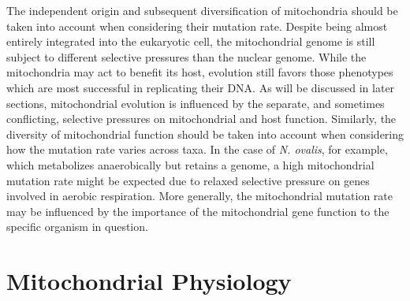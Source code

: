 \documentclass[12pt,twoside]{reedthesis}
\begin{document}
The independent origin and subsequent diversification of mitochondria should be taken into account when considering their mutation rate.
Despite being almost entirely integrated into the eukaryotic cell, the mitochondrial genome is still subject to different selective pressures than the nuclear genome.
While the mitochondria may act to benefit its host, evolution still favors those phenotypes which are most successful in replicating their DNA.
As will be discussed in later sections, mitochondrial evolution is influenced by the separate, and sometimes conflicting, selective pressures on mitochondrial and host function.
Similarly, the diversity of mitochondrial function should be taken into account when considering how the mutation rate varies across taxa. 
In the case of \textit{N. ovalis}, for example, which metabolizes anaerobically but retains a genome, a high mitochondrial mutation rate might be expected due to relaxed selective pressure on genes involved in aerobic respiration.
More generally, the mitochondrial mutation rate may be influenced by the importance of the mitochondrial gene function to the specific organism in question.

\section{Mitochondrial Physiology}
\end{document}
